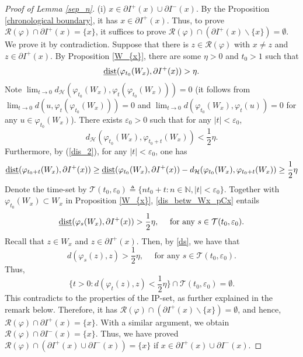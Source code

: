 \documentclass[a4paper,11pt]{article}
\theoremstyle{plain}
\theoremstyle{definition}
\numberwithin{equation}{section}
\begin{document}
\begin{proof}[Proof of Lemma \ref{sep_n}]	
    (i) $x\in \partial I^{+}(x)\cup \partial I^{-}(x)$. By the Proposition \ref{chronological boundary}, it has $x\in \partial I^{+}(x)$. Thus, to prove $\mathcal{R}(\varphi)\cap \partial I^{+}(x)=\{x\}$, it suffices to prove $\mathcal{R}(\varphi)\cap (\partial I^{+}(x)\backslash\{x\})=\emptyset$. We prove it by contradiction. Suppose that there is $z\in \mathcal{R}(\varphi)$ with $x\neq z$ and $z\in \partial  I^{+}(x)$. By Proposition \ref{W_{x}}, there are some $\eta>0$ and $t_0>1$ such that $${\rm \underline{dist}}(\varphi_{t_{0}}(W_{x}),\partial  I^{+}(x))>\eta.$$
    Note $\lim_{t\rightarrow0}d_{\mathcal{H}}(\varphi_{t_{0}}(W_{x}), \varphi_t(\varphi_{t_{0}}(W_{x})))=0$ (it follows from $\lim_{t\rightarrow0} d(u, \varphi_t (\varphi_{t_{0}}(W_{x})))=0$ and $\lim_{t\rightarrow0} d(\varphi_{t_{0}}(W_{x}), \varphi_t(u))=0$ for any $u\in \varphi_{t_{0}}(W_{x})$). There exists $\varepsilon_{0}>0$ such that for any $|t|<\varepsilon_{0}$,
	\begin{equation*}
		d_{\mathcal{H}}\left(\varphi_{t_{0}}(W_{x}), \varphi_{t_{0}+t} (W_{x})\right)<\frac{1}{2}\eta.
	\end{equation*}
    Furthermore, by (\ref{dis_2}), for any $|t|<\varepsilon_{0}$, one has
	\begin{equation}\label{dis_betw_Wx_pCx}
	    {\rm \underline{dist}}(\varphi_{t_{0}+t} (W_{x}), \partial  I^{+}(x))
        \geq {\rm \underline{dist}}(\varphi_{t_{0}}(W_{x}), \partial  I^{+}(x))-d_{\mathcal{H}}(\varphi_{t_{0}}(W_{x}),\varphi_{t_{0}+t} (W_{x}))
        \geq \frac{1}{2}\eta
	\end{equation}
	Denote the time-set by $\mathcal{T}(t_0,\varepsilon_0)\triangleq\{nt_0+t:n\in\mathbb{N},|t|<\varepsilon_0\}$. 
	Together with $\varphi_{t_{0}}(W_{x})\subset W_{x}$ in Proposition \ref{W_{x}}, \eqref{dis_betw_Wx_pCx} entails
	\begin{equation}\label{ds}
		{\rm \underline{dist}}(\varphi_{s} (W_{x}), \partial  I^{+}(x))>\frac{1}{2}\eta,\quad \text{ for any } s\in\mathcal{T}(t_0,\varepsilon_0).
	\end{equation}
	Recall that $z\in W_x$ and $z\in \partial  I^{+}(x)$. Then, by \eqref{ds}, we have that $$d(\varphi_{s}(z),z)>\frac{1}{2}\eta,\quad \text{ for any } s\in \mathcal{T}(t_0,\varepsilon_0).$$
	Thus, $$\{t>0: d(\varphi_{t}(z),z)<\frac{1}{2}\eta\}\cap \mathcal{T}(t_{0},\varepsilon_{0})=\emptyset.$$ This contradicts to the properties of the IP-set, as further explained in the remark below. Therefore, it has $\mathcal{R}(\varphi)\cap (\partial I^{+}(x)\backslash\{x\})=\emptyset$, and hence, $\mathcal{R}(\varphi)\cap \partial I^{+}(x)=\{x\}$. With a similar argument, we obtain $\mathcal{R}(\varphi)\cap \partial I^{-}(x)=\{x\}$. Thus, we have proved $\mathcal{R}(\varphi)\cap (\partial  I^{+}(x)\cup \partial  I^{-}(x))=\{x\}$ if $x\in \partial I^{+}(x)\cup \partial I^{-}(x)$.


\end{proof}
\end{document}
